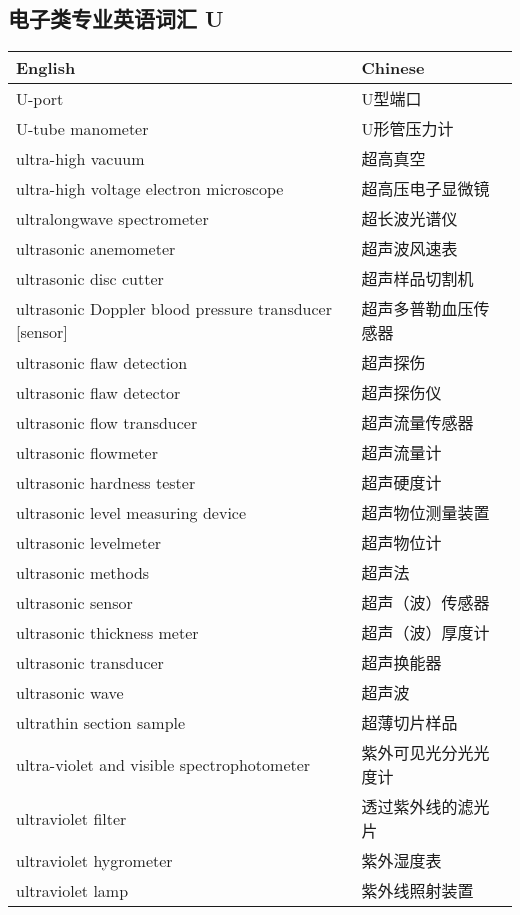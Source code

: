 \documentclass[
]{article}
\begin{document}
\hypertarget{ux7535ux5b50ux7c7bux4e13ux4e1aux82f1ux8bedux8bcdux6c47-u}{%
\subsection{\texorpdfstring{电子类专业英语词汇 U
}{电子类专业英语词汇 U }}\label{ux7535ux5b50ux7c7bux4e13ux4e1aux82f1ux8bedux8bcdux6c47-u}}

\begin{longtable}[]{@{}ll@{}}
\toprule()
English & Chinese \\
\midrule()
\endhead
U-port & U型端口 \\
U-tube manometer & U形管压力计 \\
ultra-high vacuum & 超高真空 \\
ultra-high voltage electron microscope & 超高压电子显微镜 \\
ultralongwave spectrometer & 超长波光谱仪 \\
ultrasonic anemometer & 超声波风速表 \\
ultrasonic disc cutter & 超声样品切割机 \\
ultrasonic Doppler blood pressure transducer {[}sensor{]} &
超声多普勒血压传感器 \\
ultrasonic flaw detection & 超声探伤 \\
ultrasonic flaw detector & 超声探伤仪 \\
ultrasonic flow transducer & 超声流量传感器 \\
ultrasonic flowmeter & 超声流量计 \\
ultrasonic hardness tester & 超声硬度计 \\
ultrasonic level measuring device & 超声物位测量装置 \\
ultrasonic levelmeter & 超声物位计 \\
ultrasonic methods & 超声法 \\
ultrasonic sensor & 超声（波）传感器 \\
ultrasonic thickness meter & 超声（波）厚度计 \\
ultrasonic transducer & 超声换能器 \\
ultrasonic wave & 超声波 \\
ultrathin section sample & 超薄切片样品 \\
ultra-violet and visible spectrophotometer & 紫外可见光分光光度计 \\
ultraviolet filter & 透过紫外线的滤光片 \\
ultraviolet hygrometer & 紫外湿度表 \\
ultraviolet lamp & 紫外线照射装置 \\

\end{longtable}
\end{document}
